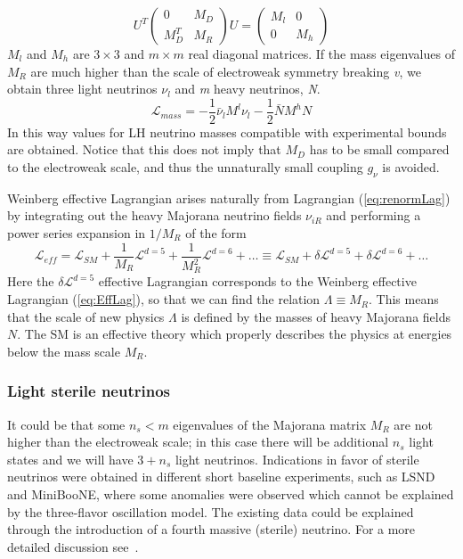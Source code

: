 \documentclass{subnucbo}
\begin{document}
\begin{equation}
U^T\begin{pmatrix}0 & M_D\\ M_D^T & M_R\end{pmatrix}U=\begin{pmatrix}M_l & 0 \\ 0 & M_h\end{pmatrix}
\end{equation}
$M_l$ and $M_h$ are $3\times3$ and $m\times m$ real diagonal matrices. If the mass eigenvalues of $M_R$ are much higher than the scale of electroweak symmetry breaking \emph{v}, we obtain three light neutrinos $\nu_l$ and \emph{m} heavy neutrinos, \emph{N}.
\begin{equation}
\mathcal{L}_{mass}=-\frac{1}{2}\bar{\nu}_lM^l\nu_l-\frac{1}{2}\bar{N}M^hN
\end{equation}
In this way values for LH neutrino masses compatible with experimental bounds are obtained. Notice that this does not imply that $M_D$ has to be small compared to the electroweak scale, and thus the unnaturally small coupling $g_{\nu}$ is avoided.

Weinberg effective Lagrangian arises naturally from Lagrangian (\ref{eq:renormLag}) by integrating out the heavy Majorana neutrino fields $\nu_{iR}$ and performing a power series expansion in $1/M_R$ of the form
\begin{equation}
\mathcal{L}_{eff}=\mathcal{L}_{SM}+\frac{1}{M_R}\mathcal{L}^{d=5}+\frac{1}{M_R^2}\mathcal{L}^{d=6}+\dots
\equiv \mathcal{L}_{SM}+\delta\mathcal{L}^{d=5}+\delta\mathcal{L}^{d=6}+\dots
\end{equation}
Here the $\delta\mathcal{L}^{d=5}$ effective Lagrangian corresponds to the Weinberg effective Lagrangian (\ref{eq:EffLag}), so that we can find the relation $\Lambda\equiv M_R$.
This means that the scale of new physics $\Lambda$ is defined by the masses of heavy Majorana fields $N$.
The SM is an effective theory which properly describes the physics at energies below the mass scale $M_R$.

\subsubsection{Light sterile neutrinos}
It could be that some $n_s<m$ eigenvalues of the Majorana matrix $M_R$ are not higher than the electroweak scale; in this case there will be additional $n_s$ light states and we will have $3+n_s$ light neutrinos.
Indications in favor of sterile neutrinos were obtained in different short baseline experiments, such as LSND and MiniBooNE, where some anomalies were observed which cannot be explained by the three-flavor oscillation model.
The existing data could be explained through the introduction of a fourth massive (sterile) neutrino. For a more detailed discussion see~\cite[sec.14]{ref:pdg}.  
\end{document}
